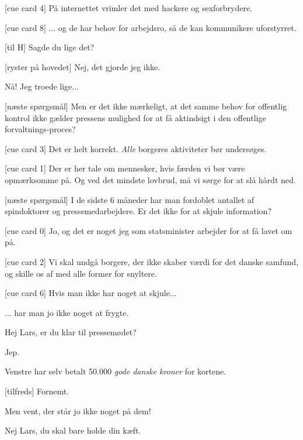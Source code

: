 \documentclass[a4paper,11pt]{article}
\begin{document}
\begin{sketch}
[cue card 4] På internettet vrimler det med hackere og sexforbrydere.

[cue card 8] ... og de har behov for arbejdsro, så de kan kommunikere uforstyrret.


[til H] Sagde du lige det?

[ryster på hovedet] Nej, det gjorde jeg ikke.

 Nå! Jeg troede lige...


[næste spørgsmål] Men er det ikke mærkeligt, at det samme behov for offentlig kontrol ikke gælder pressens mulighed for at få aktindsigt i den offentlige forvaltnings-proces?

[cue card 3] Det er helt korrekt. \emph{Alle} borgeres aktiviteter bør undersøges.

[cue card 1] Der er her tale om mennesker, hvis færden vi bør være opmærksomme på. Og ved det mindste lovbrud, må vi sørge for at slå hårdt ned.


[næste spørgsmål] I de sidste 6 måneder har man fordoblet antallet af spindoktorer og pressemedarbejdere. Er det ikke for at skjule information?

[cue card 0] Jo, og det er noget jeg som statsminister arbejder for at få lavet om på.

[cue card 2] Vi skal undgå borgere, der ikke skaber værdi for det danske samfund, og skille os af med alle former for snyltere.

[cue card 6] Hvis man ikke har noget at skjule...


 ...  har man jo ikke noget at frygte.



 Hej Lars, er du klar til pressemødet?

 Jep.


 Venstre har selv betalt 50.000 \emph{gode danske kroner} for kortene.

[tilfreds] Fornemt.


 Men vent, der står jo ikke noget på dem!

 Nej Lars, du skal bare holde din kæft.


\end{sketch}
\end{document}
